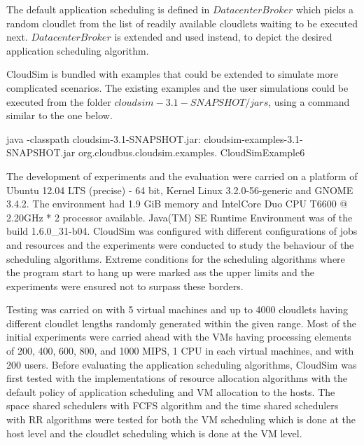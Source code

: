 \documentclass[times, 10pt,twocolumn]{article}
\begin{document}
The default application scheduling is defined in $DatacenterBroker$ which picks a random cloudlet from the list of readily available cloudlets waiting to be executed next. $DatacenterBroker$ is extended and used instead, to depict the desired application scheduling algorithm.

CloudSim is bundled with examples that could be extended to simulate more complicated scenarios. The existing examples and the user simulations could be executed from the folder $cloudsim-3.1-SNAPSHOT/jars$, using a command similar to the one below.
\begin{verbatimtab}
java -classpath
    cloudsim-3.1-SNAPSHOT.jar:
    cloudsim-examples-3.1-SNAPSHOT.jar 
    org.cloudbus.cloudsim.examples.
    CloudSimExample6
\end{verbatimtab}

The development of experiments and the evaluation were carried on a platform of Ubuntu 12.04 LTS (precise) - 64 bit, Kernel Linux 3.2.0-56-generic and GNOME 3.4.2. The environment had 1.9 GiB memory and Intel\textregistered Core Duo CPU T6600 @ 2.20GHz * 2 processor available. Java(TM) SE Runtime Environment was of the build 1.6.0\_31-b04.
CloudSim was configured with different configurations of jobs and resources and the experiments were conducted to study the behaviour of the scheduling algorithms. Extreme conditions for the scheduling algorithms where the program start to hang up were marked ass the upper limits and the experiments were ensured not to surpass these borders. 

Testing was carried on with 5 virtual machines and up to 4000 cloudlets having different cloudlet lengths randomly generated within the given range. Most of the initial experiments were carried ahead with the VMs having processing elements of 200, 400, 600, 800, and 1000 MIPS, 1 CPU in each virtual machines, and with 200 users.
Before evaluating the application scheduling algorithms, CloudSim was first tested with the implementations of resource allocation algorithms with the default policy of application scheduling and VM allocation to the hosts. The space shared schedulers with FCFS algorithm and the time shared schedulers with RR algorithms were tested for both the VM scheduling which is done at the host level and the cloudlet scheduling which is done at the VM level. 
\end{document}
